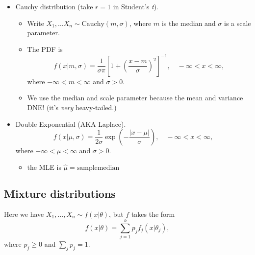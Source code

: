 \documentclass[captions=tableheading]{scrbook}
\begin{document}
\begin{itemize}
\begin{itemize}
\item Cauchy distribution (take $r = 1$ in Student's \emph{t}).
\begin{itemize}
\item Write \(X_{1},\ldots X_{n} \sim \mathrm{Cauchy}(m,\sigma)\), where $m$ is the median and $\sigma$ is a scale parameter.
\item The PDF is 
    \begin{equation}
    f(x|m,\sigma)=\frac{1}{\sigma\pi}\left[1+\left(\frac{x-m}{\sigma}\right)^{2}\right]^{-1},\quad -\infty < x <\infty,
    \end{equation}
    where $-\infty < m < \infty$ and $\sigma > 0$.
\item We use the median and scale parameter because the mean and variance DNE! (it's \emph{very} heavy-tailed.)
\end{itemize}
\item Double Exponential (AKA Laplace).
    \begin{equation}
    f(x|\mu,\sigma)=\frac{1}{2\sigma}\exp\left(-\frac{|x - \mu|}{\sigma}\right),\quad -\infty < x <\infty,
    \end{equation}
    where $-\infty < \mu < \infty$ and $\sigma > 0$.
\begin{itemize}
\item the MLE is \(\hat{\mu} = \mathrm{sample median}\)
\end{itemize}
\end{itemize}

\end{itemize} %
\subsection{Mixture distributions}
\label{sec-1_2_3}

Here we have \(X_{1},\ldots, X_{n} \sim f(x|\theta)\), but $f$ takes the form
\[
f(x|\theta) = \sum_{j=1}^{k}p_{j}f_{j}(x|\theta_{j}),
\]
where $p_{j}\geq 0$ and \(\sum_{j}p_{j}=1\).
\end{document}

